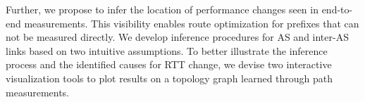 Further, we propose to infer the location of performance changes seen in end-to-end measurements. This visibility enables route optimization for prefixes that can not be measured directly.
We develop inference procedures for \acf{AS} and inter-AS links based on two intuitive assumptions.
To better illustrate the inference process and the identified causes for RTT change, we devise two interactive visualization tools to plot results on a topology graph learned through path measurements.
\vfill


\iffalse
\begin{otherlanguage}{french}
\pdfbookmark[1]{Résumé}{Résumé}
\chapter*{Résumé}
Le résume en français...
\end{otherlanguage}
\fi

\endgroup			

